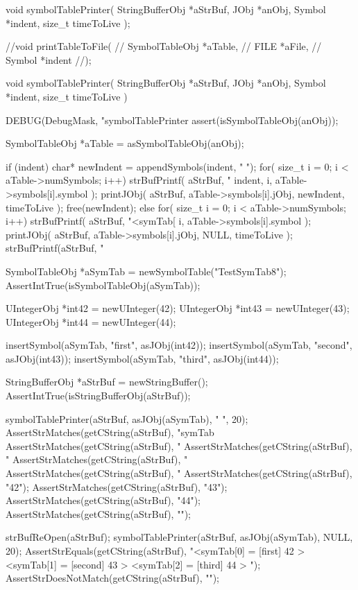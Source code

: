 \startTestSuite[symbolTablePrinter]

\startCHeader
void symbolTablePrinter(
  StringBufferObj *aStrBuf,
  JObj            *anObj,
  Symbol          *indent,
  size_t           timeToLive
);

//void printTableToFile(
//  SymbolTableObj *aTable,
//  FILE           *aFile,
//  Symbol         *indent
//);

\stopCHeader

\startCCode
void symbolTablePrinter(
  StringBufferObj *aStrBuf,
  JObj            *anObj,
  Symbol          *indent,
  size_t           timeToLive
) {
  DEBUG(DebugMask, "symbolTablePrinter %
  assert(isSymbolTableObj(anObj));
  
  SymbolTableObj *aTable = asSymbolTableObj(anObj);
  
  if (indent) {
    char* newIndent = appendSymbols(indent, "  ");
    for( size_t i = 0; i < aTable->numSymbols; i++) {
      strBufPrintf(
        aStrBuf,
        "%
        indent,
        i,
        aTable->symbols[i].symbol
      );
      printJObj(
        aStrBuf,
        aTable->symbols[i].jObj,
        newIndent,
        timeToLive
      );
    }
    free(newIndent);
  } else {
    for( size_t i = 0; i < aTable->numSymbols; i++) {
      strBufPrintf(
        aStrBuf,
        "<symTab[%
        i,
        aTable->symbols[i].symbol
      );
      printJObj(
        aStrBuf,
        aTable->symbols[i].jObj,
        NULL,
        timeToLive
      );
      strBufPrintf(aStrBuf, "%
    }
  }
}
\stopCCode


\startCTest
  SymbolTableObj *aSymTab = newSymbolTable("TestSymTab8");
  AssertIntTrue(isSymbolTableObj(aSymTab));

  UIntegerObj *int42 = newUInteger(42);
  UIntegerObj *int43 = newUInteger(43);
  UIntegerObj *int44 = newUInteger(44);
  
  insertSymbol(aSymTab, "first",  asJObj(int42));
  insertSymbol(aSymTab, "second", asJObj(int43));
  insertSymbol(aSymTab, "third",  asJObj(int44));
  
  StringBufferObj *aStrBuf = newStringBuffer();
  AssertIntTrue(isStringBufferObj(aStrBuf));

  symbolTablePrinter(aStrBuf, asJObj(aSymTab), "  ", 20);
  AssertStrMatches(getCString(aStrBuf), "symTab%
  AssertStrMatches(getCString(aStrBuf), "%
  AssertStrMatches(getCString(aStrBuf), "%
  AssertStrMatches(getCString(aStrBuf), "%
  AssertStrMatches(getCString(aStrBuf), "%
  AssertStrMatches(getCString(aStrBuf), "42");
  AssertStrMatches(getCString(aStrBuf), "43");
  AssertStrMatches(getCString(aStrBuf), "44");
  AssertStrMatches(getCString(aStrBuf), "\n");

  strBufReOpen(aStrBuf);
  symbolTablePrinter(aStrBuf, asJObj(aSymTab), NULL, 20);
  AssertStrEquals(getCString(aStrBuf), "<symTab[0] = [first] 42 > <symTab[1] = [second] 43 > <symTab[2] = [third] 44 > ");
  AssertStrDoesNotMatch(getCString(aStrBuf), "\n");
  
\stopCTest
\stopTestCase
\stopTestSuite